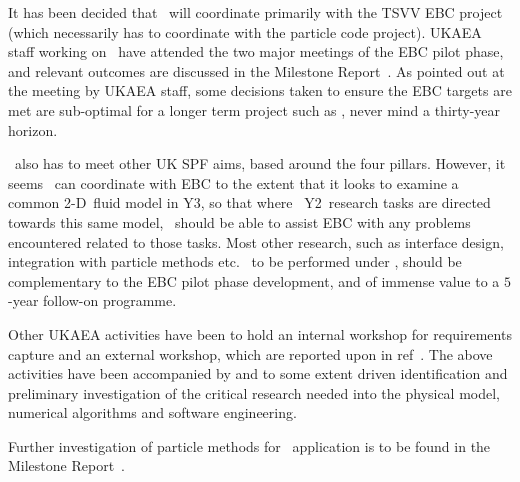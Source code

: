 It has been decided  that \nep \ will coordinate primarily with the TSVV EBC project
(which necessarily has to coordinate with the particle code project).
UKAEA staff working on \nep \ have attended the two major meetings of the EBC pilot
phase, and relevant outcomes are discussed in the Milestone Report~\cite{y1re331}.
As pointed out at the meeting by UKAEA staff, some decisions taken to ensure
the EBC targets are met are sub-optimal for a longer term project such as \nep,
never mind a thirty-year horizon.

\nep \ also has to meet other UK SPF aims, based around the four pillars. However,
it seems \nep \ can coordinate with EBC to the extent that it looks to examine a common 2-D~fluid
model in Y3, so that where \nep \ Y2~research tasks are directed towards this same model,
\nep \ should be able to assist EBC with any problems encountered related to those tasks.
Most other research, such as interface design, integration with particle methods etc. \ to
be performed under \nep, should be complementary to the EBC pilot phase development,
and of immense value to a $5$-year follow-on programme.

Other UKAEA activities have been to hold an internal workshop for requirements capture
and an external workshop, which are reported upon in ref~\cite{y1re111a,y1re111b}. 
The above activities have been accompanied by and to some extent driven 
identification and preliminary investigation of the critical research needed
into the physical model, numerical algorithms and software engineering.

Further investigation of particle methods for \nep \ application
is to be found in the Milestone Report~\cite{y1re231}.

%
%
%
%
%
